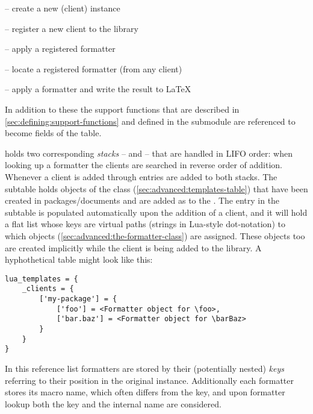 \documentclass[12pt]{scrartcl}
\begin{document}
\begin{itemize*}
\item {} -- create a new  (client) instance
\item {} -- register a new client to the library
\item {} -- apply a registered formatter
\item {} -- locate a registered formatter (from any client)
\item {} -- apply a formatter and write the result to \LaTeX
\end{itemize*}

\noindent In addition to these the support functions that are described in
\vref{sec:defining:support-functions} and defined in the submodule
 are referenced to become fields of
the  table.

 holds two corresponding \emph{stacks} --
 and  -- that are handled in LIFO order:
when looking up a formatter the clients are searched in reverse order of
addition.  Whenever a client is added through 
entries are added to both stacks.
The  subtable holds objects of the 
class (\vref{sec:advanced:templates-table}) that have been created in
packages/documents and are added as  to the
.  The entry in the  subtable is
populated automatically upon the addition of a client, and it will hold a flat
list whose keys are virtual paths (strings in Lua-style dot-notation) to which
 objects (\vref{sec:advanced:the-formatter-class}) are
assigned.  These  objects too are created implicitly while the
client is being added to the library.  A hyphothetical  table might look like this:

\begin{verbatim}
lua_templates = {
	_clients = {
		['my-package'] = {
			['foo'] = <Formatter object for \foo>,
			['bar.baz'] = <Formatter object for \barBaz>
		}
	}
}
\end{verbatim}

\noindent In this reference list formatters are stored by their (potentially
nested) \emph{keys} referring to their position in the original
 instance.  Additionally each formatter stores its macro
name, which often differs from the key, and upon formatter lookup both the key
and the internal name are considered.
\end{document}
